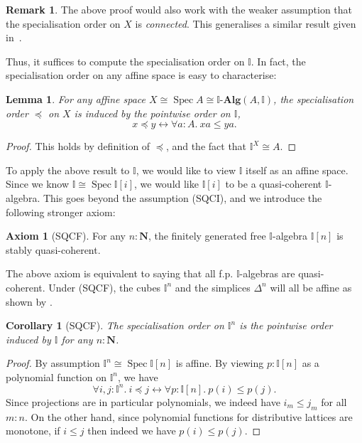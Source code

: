 \documentclass[12pt]{amsart}
\newtheorem{lemma}[theorem]{Lemma}
\newtheorem{corollary}[theorem]{Corollary}
\theoremstyle{definition}
\newtheorem{remark}[theorem]{Remark}
\newtheorem*{axiom}{Axiom}
\newcommand{\mb}[1]{\mathbf{#1}}
\newcommand{\mbb}[1]{\mathbb{#1}}
\newcommand{\I}{\mbb I}
\newcommand{\alg}{\text{-}\mb{Alg}}
\newcommand{\N}{\mb N}
\newcommand{\fa}[2]{\forall #1\!\colon\!\!#2.\ }
\newcommand{\eq}{\leftrightarrow}
\newcommand{\spec}{\operatorname{Spec}}
\begin{document}
\begin{remark}
  The above proof would also work with the weaker assumption that the specialisation order on $X$ is \emph{connected}. This generalises a similar result given in~\cite[Prop. 4.4.1]{hyland2006first}.
\end{remark}

Thus, it suffices to compute the specialisation order on $\I$. In fact, the specialisation order on any affine space is easy to characterise:

\begin{lemma}\label{lem:specorderofaffine}
  For any affine space $X \cong \spec A \cong \I\alg(A,\I)$, the specialisation order $\preceq$ on $X$ is induced by the pointwise order on $\I$,
  \[ x \preceq y \eq \fa aA xa \le ya. \]
\end{lemma}
\begin{proof}
  This holds by definition of $\preceq$, and the fact that $\I^X \cong A$.
\end{proof}

To apply the above result to $\I$, we would like to view $\I$ itself as an affine space. Since we know $\I \cong \spec\I[i]$, we would like $\I[i]$ to be a quasi-coherent $\I$-algebra. This goes beyond the assumption (SQCI), and we introduce the following stronger axiom:

\begin{axiom}[SQCF]
  For any $n : \N$, the finitely generated free $\I$-algebra $\I[n]$ is stably quasi-coherent. 
\end{axiom}

The above axiom is equivalent to saying that all f.p. $\I$-algebras are quasi-coherent. Under (SQCF), the cubes $\I^n$ and the simplices $\Delta^n$ will all be affine as shown by .

\begin{corollary}[SQCF]\label{cor:pointwisecubeorder}
  The specialisation order on $\I^n$ is the pointwise order induced by $\I$ for any $n : \N$.
\end{corollary}
\begin{proof}
  By assumption $\I^n \cong \spec\I[n]$ is affine. By viewing $p : \I[n]$ as a polynomial function on $\I^n$, we have
  \[ \fa{i,j}{\I^n} i \preceq j \eq \fa p{\I[n]} p(i) \le p(j). \]
  Since projections are in particular polynomials, we indeed have $i_m \le j_m$ for all $m : n$. On the other hand, since polynomial functions for distributive lattices are monotone, if $i \le j$ then indeed we have $p(i) \le p(j)$. 
\end{proof}
\end{document}
